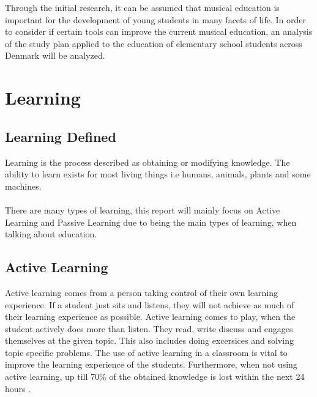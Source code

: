 Through the initial research, it can be assumed that musical education is important for the development of young students in many facets of life. In order to consider if certain tools can improve the current musical education, an analysis of the study plan applied to the education of elementary school students across Denmark will be analyzed.

\section{Learning}
\subsection{Learning Defined}\label{sec:learning}
Learning is the process described as obtaining or modifying knowledge. The ability to learn exists for most living things i.e humans, animals, plants and some machines. \\
\\
There are many types of learning, this report will mainly focus on Active Learning and Passive Learning due to being the main types of learning, when talking about education.

\subsection*{Active Learning}\label{sec:activeLearning}
Active learning comes from a person taking control of their own learning experience. If a student just sits and listens, they will not achieve as much of their learning experience as possible. Active learning comes to play, when the student actively does more than listen. They read, write discuss and engages themselves at the given topic. This also includes doing excersices and solving topic specific problems\cite{activelearning}. The use of active learning in a classroom is vital to improve the learning experience of the students. Furthermore, when not using active learning, up till 70\% of the obtained knowledge is lost within the next 24 hours \cite{learning}.\\

